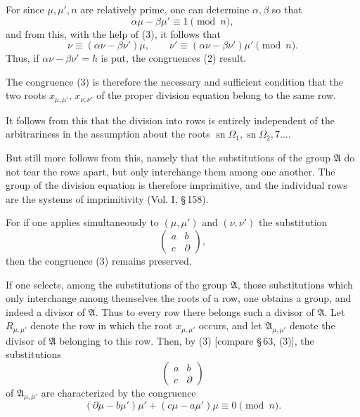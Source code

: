\documentclass[11pt]{article}
\providecommand{\sn}{\operatorname{sn}}
\begin{document}
For since $\mu,\mu',n$ are relatively prime, one can determine $\alpha,\beta$ so that
\[
 \alpha\mu-\beta\mu'\equiv1\pmod n,
\]
and from this, with the help of (3), it follows that
\[
 \nu\equiv(\alpha\nu-\beta\nu')\mu,
 \qquad
 \nu'\equiv(\alpha\nu-\beta\nu')\mu'\pmod n.
\]
Thus, if $\alpha\nu-\beta\nu'=h$ is put, the congruences (2) result.

The congruence (3) is therefore the necessary and sufficient condition that the two roots
$x_{\mu,\mu'}$, $x_{\nu,\nu'}$ of the proper division equation belong to the same row.

It follows from this that the division into rows is entirely independent of the arbitrariness
in the assumption about the roots $\sn\Omega_1,\sn\Omega_2,7\ldots$.

But still more follows from this, namely that the substitutions of the group $\mathfrak A$ do
not tear the rows apart, but only interchange them among one another. The group of the
division equation is therefore imprimitive, and the individual rows are the systems of
imprimitivity (Vol. I, \S\,158).

For if one applies simultaneously to $(\mu,\mu')$ and $(\nu,\nu')$ the substitution
\[
 \begin{pmatrix}a&b\\ c&\partial\end{pmatrix},
\]
then the congruence (3) remains preserved.

If one selects, among the substitutions of the group $\mathfrak A$, those substitutions which
only interchange among themselves the roots of a row, one obtains a group, and indeed a
divisor of $\mathfrak A$. Thus to every row there belongs such a divisor of $\mathfrak A$.
Let $R_{\mu,\mu'}$ denote the row in which the root $x_{\mu,\mu'}$ occurs, and let
$\mathfrak A_{\mu,\mu'}$ denote the divisor of $\mathfrak A$ belonging to this row. Then, by
(3) [compare \S\,63, (3)], the substitutions
\[
 \begin{pmatrix}a&b\\ c&\partial\end{pmatrix}
\]
of $\mathfrak A_{\mu,\mu'}$ are characterized by the congruence
\begin{equation}
 (\partial\mu-b\mu')\mu' + (c\mu-a\mu')\mu\equiv0\pmod n.
\tag{4}
\end{equation}
\end{document}
